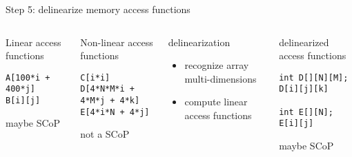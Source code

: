 \documentclass{beamer}
\begin{document}
\begin{frame}[fragile]{Step 5: delinearize memory access functions}
  \begin{columns}[T,onlytextwidth] %
    \begin{block}{\small Linear access functions}
      \begin{lstlisting}
A[100*i + 400*j]
B[i][j]
      \end{lstlisting}
      {\small \color{myblue} maybe SCoP}
    \end{block}

    \vspace{.7cm}
    \pause
    \begin{block}{\small Non-linear access functions} 
      \begin{lstlisting}
C[i*i]
D[4*N*M*i + 4*M*j + 4*k]
E[4*i*N + 4*j]
      \end{lstlisting}

      {\small \color{myred} not a SCoP}
    \end{block}
    \pause
    \begin{block}{\small delinearization}
      \begin{itemize}
      \item recognize array multi-dimensions
      \item compute linear access functions
      \end{itemize}
    \end{block}
    \pause
    \begin{block}{\small delinearized access functions}
      \begin{lstlisting}
int D[][N][M];
D[i][j][k]

int E[][N];
E[i][j]
      \end{lstlisting}

      {\small \color{myblue} maybe SCoP}
    \end{block}
  \end{columns}
\end{frame}
\end{document}
